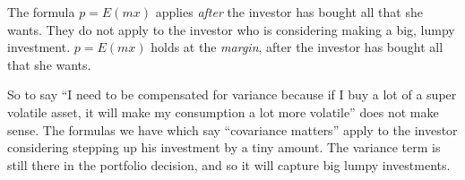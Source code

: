 \documentclass[12pt]{article}
\theoremstyle{plain}
\theoremstyle{definition}
\theoremstyle{remark}
\begin{document}
The formula $p=E(mx)$ applies \emph{after} the investor has bought all that she
wants. They do not apply to the investor who is considering making a
big, lumpy investment. $p=E(mx)$ holds at the \emph{margin}, after the
investor has bought all that she wants.

So to say ``I need to be compensated for variance because if I buy a lot
of a super volatile asset, it will make my consumption a lot more
volatile'' does not make sense. The formulas we have which say
``covariance matters'' apply to the investor considering stepping up his
investment by a tiny amount. The variance term is still there in the
portfolio decision, and so it will capture big lumpy investments.





\end{document}
